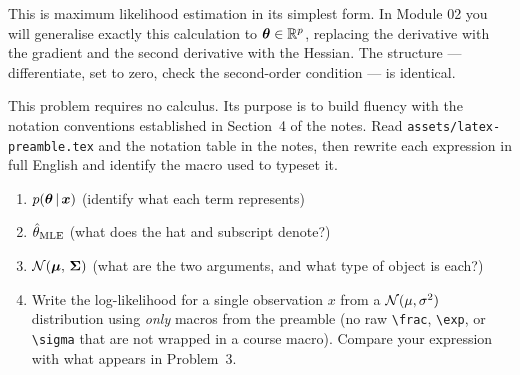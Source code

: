 \documentclass[11pt, letterpaper]{article}
\begin{document}
\vspace{16pt}

\begin{bridgebox}
This is maximum likelihood estimation in its simplest form. In Module 02 you
will generalise exactly this calculation to $\bm{\theta} \in \mathbb{R}^p$, replacing
the derivative with the gradient and the second derivative with the Hessian.
The structure — differentiate, set to zero, check the second-order condition
— is identical.
\end{bridgebox}

\vspace{24pt}


\begin{problembox}[title={Problem 4 \hfill $\star\star\star$ — Extension (Optional)}]
This problem requires no calculus. Its purpose is to build fluency with the
notation conventions established in Section~4 of the notes. Read
\texttt{assets/latex-preamble.tex} and the notation table in the notes, then
rewrite each expression in full English and identify the macro used to
typeset it.
\end{problembox}

\begin{enumerate}
  \item $p(\bm{\theta} \,\vert\, \bm{x})$ \quad (identify what each term represents)

  \item $\hat{\theta}_{\text{MLE}}$ \quad (what does the hat and subscript denote?)

  \item $\mathcal{N}\!\left(\bm{\mu},\,\bm{\Sigma}\right)$ \quad (what are the two arguments, and what type
  of object is each?)

  \item Write the log-likelihood for a single observation $x$ from a
  $\mathcal{N}(\mu, \sigma^2)$ distribution using \emph{only} macros from the
  preamble (no raw \texttt{\textbackslash frac}, \texttt{\textbackslash exp},
  or \texttt{\textbackslash sigma} that are not wrapped in a course macro).
  Compare your expression with what appears in Problem~3.
\end{enumerate}

\vspace{24pt}
\end{document}
